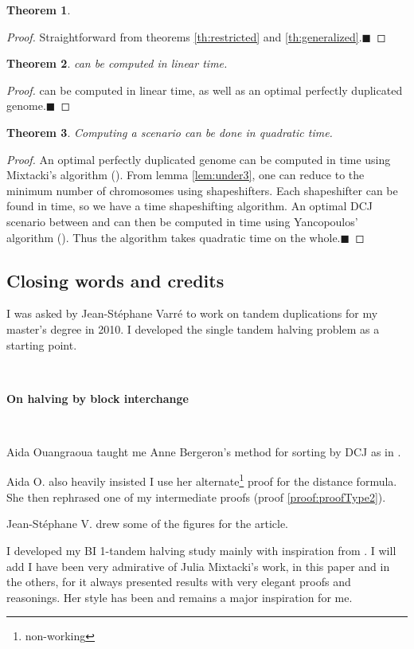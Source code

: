 \documentclass[11pt,final,twoside,nofrench]{thlifl}
\newcommand{\qed}{\ensuremath{\blacksquare}}
\newtheorem{proof}{Proof}
\newtheorem{theorem}{Theorem}
\begin{document}
{\begin{theorem}
\end{theorem}

\begin{proof} 
Straightforward from theorems \ref{th:restricted} and \ref{th:generalized}.\qed 
\end{proof}

\begin{theorem}
  can be computed in linear time.
\end{theorem}
\begin{proof}
 can be computed in linear time, as well as an optimal perfectly duplicated genome.\qed
\end{proof}

\begin{theorem}
    Computing a scenario can be done in quadratic time.
\end{theorem}
\begin{proof}
An optimal perfectly duplicated genome can be computed in  time using Mixtacki's algorithm (\cite{Mixtacki08}).
From lemma \ref{lem:under3}, one can reduce  to the minimum number of chromosomes using  shapeshifters. Each shapeshifter can be found in  time, so we have a  time shapeshifting algorithm.
An optimal DCJ scenario between  and  can then be computed in  time using Yancopoulos' algorithm (\cite{Yancopoulos05}). Thus the algorithm takes quadratic time on the whole.\qed
\end{proof}

\subsection{Closing words and credits}

I was asked by Jean-Stéphane Varré to work on tandem duplications for my master's degree in 2010. I developed the single tandem halving problem as a starting point.

~~

\textbf{On halving by block interchange}

~~

Aida Ouangraoua taught me Anne Bergeron's method for sorting by DCJ as in \cite{BMS06}.

Aida O. also heavily insisted I use her alternate\footnote{non-working} proof for the distance formula. She then rephrased one of my intermediate proofs (proof \ref{proof:proofType2}).

Jean-Stéphane V. drew some of the figures for the article.

I developed my BI 1-tandem halving study mainly with inspiration from \cite{Mixtacki08}. I will add I have been very admirative of Julia Mixtacki's work, in this paper and in the others, for it always presented results with very elegant proofs and reasonings. Her style has been and remains a major inspiration for me.

}
\end{document}
